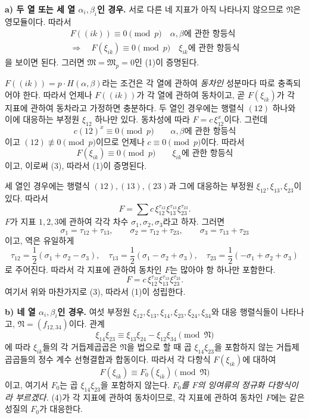 \textbf{a) 두 열 또는 세 열 \(\alpha_i,\beta_i\)인 경우.}
서로 다른 네 지표가 아직 나타나지 않으므로 \(\mathfrak N\)은 영모듈이다. 따라서
\begin{equation}
\tag{3}
\begin{array}{c}
F((ik))\equiv0\pmod p\quad\text{\(\alpha,\beta\)에 관한 항등식}\\[2pt]
\Longrightarrow\quad
F(\xi_{ik})\equiv0\pmod p\quad\text{\(\xi_{ik}\)에 관한 항등식}
\end{array}
\end{equation}
을 보이면 된다. 그러면 \(\mathfrak M=\mathfrak M_p=0\)인 (1)이 증명된다.

\(F((ik))=p\cdot H(\alpha,\beta)\)라는 조건은 각 열에 관하여 \emph{동차인} 성분마다 따로 충족되어야 한다. 따라서 언제나 \(F((ik))\)가 각 열에 관하여 동차이고, 곧 \(F(\xi_{ik})\)가 각 지표에 관하여 동차라고 가정하면 충분하다. 두 열인 경우에는 행렬식 \((12)\) 하나와 이에 대응하는 부정원 \(\xi_{12}\) 하나만 있다. 동차성에 따라 \(F=c\,\xi_{12}^x\)이다. 그런데
\[
c(12)^x\equiv0\pmod p
\qquad\text{\(\alpha,\beta\)에 관한 항등식}
\]
이고 \((12)\not\equiv0\pmod p\)이므로 언제나 \(c\equiv0\pmod p\)이다. 따라서
\[
F(\xi_{ik})\equiv0\pmod p
\qquad\text{\(\xi_{ik}\)에 관한 항등식}
\]
이고, 이로써 (3), 따라서 (1)이 증명된다.

세 열인 경우에는 행렬식 \((12),(13),(23)\)과 그에 대응하는 부정원 \(\xi_{12},\xi_{13},\xi_{23}\)이 있다. 따라서
\[
F=\sum c\,\xi_{12}^{\tau_{12}}\xi_{13}^{\tau_{13}}\xi_{23}^{\tau_{23}}.
\]
\(F\)가 지표 \(1,2,3\)에 관하여 각각 차수 \(\sigma_1,\sigma_2,\sigma_3\)라고 하자. 그러면
\[
\sigma_1=\tau_{12}+\tau_{13},\qquad
\sigma_2=\tau_{12}+\tau_{23},\qquad
\sigma_3=\tau_{13}+\tau_{23}
\]
이고, 역은 유일하게
\[
\tau_{12}=\frac12(\sigma_1+\sigma_2-\sigma_3),\quad
\tau_{13}=\frac12(\sigma_1-\sigma_2+\sigma_3),\quad
\tau_{23}=\frac12(-\sigma_1+\sigma_2+\sigma_3)
\]
로 주어진다. 따라서 각 지표에 관하여 동차인 \(F\)는 많아야 항 하나만 포함한다.
\[
F=c\,\xi_{12}^{\tau_{12}}\xi_{13}^{\tau_{13}}\xi_{23}^{\tau_{23}}.
\]
여기서 위와 마찬가지로 (3), 따라서 (1)이 성립한다.

\textbf{b) 네 열 \(\alpha_i,\beta_i\)인 경우.}
여섯 부정원 \(\xi_{12},\xi_{13},\xi_{14},\xi_{23},\xi_{24},\xi_{34}\)와 대응 행렬식들이 나타나고, \(\mathfrak N=(f_{12,34})\)이다. 관계
\begin{equation}
\tag{4}
\xi_{14}\xi_{23}\equiv\xi_{13}\xi_{24}-\xi_{12}\xi_{34}
\pmod{\mathfrak N}
\end{equation}
에 따라 \(\xi_{ik}\)들의 각 거듭제곱곱은 \(\mathfrak N\)을 법으로 할 때 곱 \(\xi_{14}\xi_{23}\)을 포함하지 않는 거듭제곱곱들의 정수 계수 선형결합과 합동이다. 따라서 각 다항식 \(F(\xi_{ik})\)에 대하여
\begin{equation}
\tag{5}
F(\xi_{ik})\equiv F_0(\xi_{ik})\pmod{\mathfrak N}
\end{equation}
이고, 여기서 \(F_0\)는 곱 \(\xi_{14}\xi_{23}\)을 포함하지 않는다. \emph{\(F_0\)를 \(F\)의 잉여류의 정규화 다항식이라 부르겠다.} (4)가 각 지표에 관하여 동차이므로, 각 지표에 관하여 동차인 \(F\)에는 같은 성질의 \(F_0\)가 대응한다.

